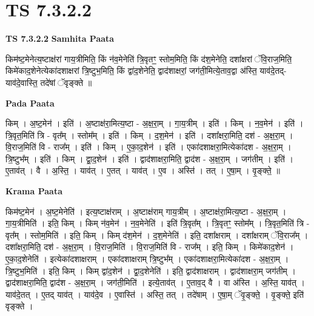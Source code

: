 \documentclass[17pt]{extarticle}
\begin{document}
\section{ TS 7.3.2.2 }

\textbf{TS 7.3.2.2 } \newline
\textbf{Samhita Paata} \newline

किम॑ष्ट॒मेनेत्य॒ष्टाक्ष॑रां गाय॒त्रीमिति॒ किं न॑व॒मेनेति॑ त्रि॒वृतꣳ॒॒ स्तोम॒मिति॒ किं द॑श॒मेनेति॒ दशा᳚क्षरां ॅवि॒राज॒मिति॒ किमे॑काद॒शेनेत्येका॑दशाक्षरां त्रि॒ष्टुभ॒मिति॒ किं द्वा॑द॒शेनेति॒ द्वाद॑शाक्षरां॒ जग॑ती॒मित्ये॒ताव॒द्वा अ॑स्ति॒ याव॑दे॒तद्-याव॑दे॒वास्ति॒ तदे॑षां ॅवृङ्क्ते ॥ \newline

\textbf{Pada Paata} \newline

किम् । अ॒ष्ट॒मेन॑ । इति॑ । अ॒ष्टाक्ष॑रा॒मित्य॒ष्टा - अ॒क्ष॒रा॒म् । गा॒य॒त्रीम् । इति॑ । किम् । न॒व॒मेन॑ । इति॑ । त्रि॒वृत॒मिति॑ त्रि - वृत᳚म् । स्तोम᳚म् । इति॑ । किम् । द॒श॒मेन॑ । इति॑ । दशा᳚क्षरा॒मिति॒ दश॑ - अ॒क्ष॒रा॒म् । वि॒राज॒मिति॑ वि - राज᳚म् । इति॑ । किम् । ए॒का॒द॒शेन॑ । इति॑ । एका॑दशाक्षरा॒मित्येका॑दश - अ॒क्ष॒रा॒म् । त्रि॒ष्टुभ᳚म् । इति॑ । किम् । द्वा॒द॒शेन॑ । इति॑ । द्वाद॑शाक्षरा॒मिति॒ द्वाद॑श - अ॒क्ष॒रा॒म् । जग॑तीम् । इति॑ । ए॒ताव॑त् । वै । अ॒स्ति॒ । याव॑त् । ए॒तत् । याव॑त् । ए॒व । अस्ति॑ । तत् । ए॒षा॒म् । वृ॒ङ्क्ते॒ ॥  \newline


\textbf{Krama Paata} \newline

किम॑ष्ट॒मेन॑ । अ॒ष्ट॒मेनेति॑ । इत्य॒ष्टाक्ष॑राम् । अ॒ष्टाक्ष॑राम् गाय॒त्रीम् । अ॒ष्टाक्ष॑रा॒मित्य॒ष्टा - अ॒क्ष॒रा॒म् । गा॒य॒त्रीमिति॑ । इति॒ किम् । किम् न॑व॒मेन॑ । न॒व॒मेनेति॑ । इति॑ त्रि॒वृत᳚म् । त्रि॒वृतꣳ॒॒ स्तोम᳚म् । त्रि॒वृत॒मिति॑ त्रि - वृत᳚म् । स्तोम॒मिति॑ । इति॒ किम् । किम् द॑श॒मेन॑ । द॒श॒मेनेति॑ । इति॒ दशा᳚क्षराम् । दशा᳚क्षराम् ॅवि॒राज᳚म् । दशा᳚क्षरा॒मिति॒ दश॑ - अ॒क्ष॒रा॒म् । वि॒राज॒मिति॑ । वि॒राज॒मिति॑ वि - राज᳚म् । इति॒ किम् । किमे॑काद॒शेन॑ । ए॒का॒द॒शेनेति॑ । इत्येका॑दशाक्षराम् । एका॑दशाक्षराम् त्रि॒ष्टुभ᳚म् । एका॑दशाक्षरा॒मित्येका॑दश - अ॒क्ष॒रा॒म् । त्रि॒ष्टुभ॒मिति॑ । इति॒ किम् । किम् द्वा॑द॒शेन॑ । द्वा॒द॒शेनेति॑ । इति॒ द्वाद॑शाक्षराम् । द्वाद॑शाक्षरा॒म् जग॑तीम् । द्वाद॑शाक्षरा॒मिति॒ द्वाद॑श - अ॒क्ष॒रा॒म् । जग॑ती॒मिति॑ । इत्ये॒ताव॑त् । ए॒ताव॒द् वै । वा अ॑स्ति । अ॒स्ति॒ याव॑त् । याव॑दे॒तत् । ए॒तद् याव॑त् । याव॑दे॒व । ए॒वास्ति॑ । अस्ति॒ तत् । तदे॑षाम् । ए॒षा॒म् ॅवृ॒ङ्‍क्ते॒ । वृ॒ङ्‍क्ते॒ इति॑ वृङ्‍क्ते । \newline
\end{document}
